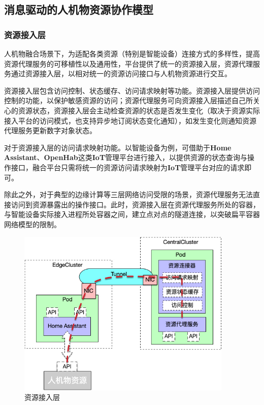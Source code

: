 \documentclass[a4paper]{article}
\theoremstyle{definition}
\begin{document}
\subsection{消息驱动的人机物资源协作模型}

\subsubsection{资源接入层}

人机物融合场景下，为适配各类资源（特别是智能设备）连接方式的多样性，提高资源代理服务的可移植性以及通用性，平台提供了统一的资源接入层，资源代理服务通过资源接入层，以相对统一的资源访问接口与人机物资源进行交互。

资源接入层包含访问控制、状态缓存、访问请求映射等功能。资源接入层提供访问控制的功能，以保护敏感资源的访问；资源代理服务可向资源接入层描述自己所关心的资源状态，资源接入层会主动检查资源的状态是否发生变化（取决于资源实际接入平台的访问模式，也支持异步地订阅状态变化通知），如发生变化则通知资源代理服务更新数字对象状态。

对于资源接入层的访问请求映射功能。以智能设备为例，可借助于\textbf{Home Assistant}、\textbf{OpenHab}这类\textbf{IoT}管理平台进行接入，以提供资源的状态查询与操作接口，融合平台只需将统一的资源访问请求映射为\textbf{IoT}管理平台对应的请求即可。

除此之外，对于典型的边缘计算等三层网络访问受限的场景，资源代理服务无法直接访问到资源暴露出的操作接口。此时，资源接入层在资源代理服务所处的容器，与智能设备实际接入进程所处容器之间，建立点对点的隧道连接，以突破扁平容器网络模型的限制。

\begin{figure}[ht]
 \centering
 \includegraphics[height=8cm]{images/connector.jpg}
 \caption{资源接入层}
 \label{fig:singleblock}
\end{figure}
\end{document}
